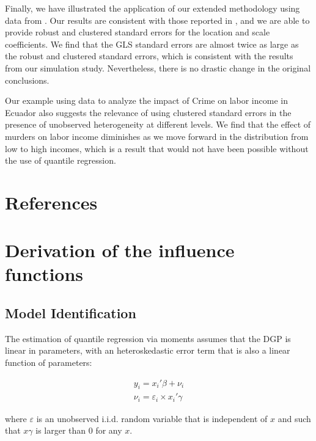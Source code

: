 \documentclass[
  12pt,
  oneside]{article}
\begin{document}
Finally, we have illustrated the application of our extended methodology
using data from \citet{persson_economic_2005}. Our results are
consistent with those reported in \citet{mss2019}, and we are able to
provide robust and clustered standard errors for the location and scale
coefficients. We find that the GLS standard errors are almost twice as
large as the robust and clustered standard errors, which is consistent
with the results from our simulation study. Nevertheless, there is no
drastic change in the original conclusions.

Our example using data to analyze the impact of Crime on labor income in
Ecuador also suggests the relevance of using clustered standard errors
in the presence of unobserved heterogeneity at different levels. We find
that the effect of murders on labor income diminishes as we move forward
in the distribution from low to high incomes, which is a result that
would not have been possible without the use of quantile regression.

\section*{References}\label{references}

\renewcommand{\bibsection}{}


\newpage{}

\appendix

\section{Derivation of the influence
functions}\label{derivation-of-the-influence-functions}

\subsection{Model Identification}\label{model-identification}

The estimation of quantile regression via moments assumes that the DGP
is linear in parameters, with an heteroskedastic error term that is also
a linear function of parameters:

\[\begin{aligned}
y_i = x_i'\beta + \nu_i \\
\nu_i = \varepsilon_i \times x_i'\gamma
\end{aligned}
\]

where \(\varepsilon\) is an unobserved i.i.d. random variable that is
independent of \(x\) and such that \(x\gamma\) is larger than 0 for any
\(x\).
\end{document}
